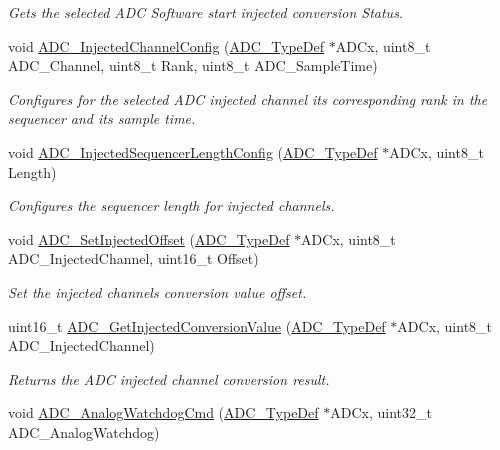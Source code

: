 \begin{DoxyCompactItemize}
\begin{DoxyCompactList}\small\item\em Gets the selected A\+DC Software start injected conversion Status. \end{DoxyCompactList}\item 
void \hyperlink{group___a_d_c___private___functions_gae2b44bff080184e1cf6f2cb6b9bb3e59}{A\+D\+C\+\_\+\+Injected\+Channel\+Config} (\hyperlink{struct_a_d_c___type_def}{A\+D\+C\+\_\+\+Type\+Def} $\ast$A\+D\+Cx, uint8\+\_\+t A\+D\+C\+\_\+\+Channel, uint8\+\_\+t Rank, uint8\+\_\+t A\+D\+C\+\_\+\+Sample\+Time)
\begin{DoxyCompactList}\small\item\em Configures for the selected A\+DC injected channel its corresponding rank in the sequencer and its sample time. \end{DoxyCompactList}\item 
void \hyperlink{group___a_d_c___private___functions_ga24eba90bc3ee955e07659a605011710d}{A\+D\+C\+\_\+\+Injected\+Sequencer\+Length\+Config} (\hyperlink{struct_a_d_c___type_def}{A\+D\+C\+\_\+\+Type\+Def} $\ast$A\+D\+Cx, uint8\+\_\+t Length)
\begin{DoxyCompactList}\small\item\em Configures the sequencer length for injected channels. \end{DoxyCompactList}\item 
void \hyperlink{group___a_d_c___private___functions_ga07a942613088ab3ecfc3d97a20475920}{A\+D\+C\+\_\+\+Set\+Injected\+Offset} (\hyperlink{struct_a_d_c___type_def}{A\+D\+C\+\_\+\+Type\+Def} $\ast$A\+D\+Cx, uint8\+\_\+t A\+D\+C\+\_\+\+Injected\+Channel, uint16\+\_\+t Offset)
\begin{DoxyCompactList}\small\item\em Set the injected channels conversion value offset. \end{DoxyCompactList}\item 
uint16\+\_\+t \hyperlink{group___a_d_c___private___functions_ga1dea5ed24571a2e0ce4cbd41c9c1ec46}{A\+D\+C\+\_\+\+Get\+Injected\+Conversion\+Value} (\hyperlink{struct_a_d_c___type_def}{A\+D\+C\+\_\+\+Type\+Def} $\ast$A\+D\+Cx, uint8\+\_\+t A\+D\+C\+\_\+\+Injected\+Channel)
\begin{DoxyCompactList}\small\item\em Returns the A\+DC injected channel conversion result. \end{DoxyCompactList}\item 
void \hyperlink{group___a_d_c___private___functions_gad017d69bec6e497afd35ba25ea22d86e}{A\+D\+C\+\_\+\+Analog\+Watchdog\+Cmd} (\hyperlink{struct_a_d_c___type_def}{A\+D\+C\+\_\+\+Type\+Def} $\ast$A\+D\+Cx, uint32\+\_\+t A\+D\+C\+\_\+\+Analog\+Watchdog)

\end{DoxyCompactItemize}
